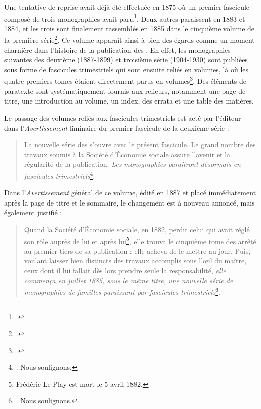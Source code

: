 Une tentative de reprise avait déjà été effectuée en 1875 où \og un premier fascicule composé de trois monographies \fg{} avait paru\footcite[p. III]{averts1t5}. Deux autres paraissent en 1883 et 1884, et les trois sont finalement rassemblés en 1885 dans le cinquième volume de la première série\footcite[p. III]{averts1t5}. Ce volume apparaît ainsi à bien des égards comme un moment charnière dans l'histoire de la publication des \odm. En effet, les monographies suivantes des deuxième (1887-1899) et troisième série (1904-1930) sont publiées sous forme de fascicules trimestriels qui sont ensuite reliés en volumes, là où les quatre premiers tomes étaient directement parus en volumes\footnote{\cite[p. 124]{lorry}.}. Des éléments de paratexte sont systématiquement fournis aux relieurs, notamment une page de titre, une introduction au volume, un index, des errata et une table des matières.

Le passage des volumes reliés aux fascicules trimestriels est acté par l'éditeur dans l'\textit{Avertissement} liminaire du premier fascicule de la deuxième série :

\begin{quote}
    \og La nouvelle série des \odm{} s'ouvre avec 
le présent fascicule. Le grand nombre des travaux soumis à la 
Société d'Économie sociale assure l'avenir et la régularité 
de la publication. \textit{Les monographies paraîtront désormais en 
fascicules trimestriels}\footnote{\cite[\og Avertissement \fg{}]{mono047a}. Nous soulignons.}. \fg{}
\end{quote}

Dans l'\textit{Avertissement} général de ce volume, édité en 1887 et placé immédiatement après la page de titre et le sommaire, le changement est à nouveau annoncé, mais également justifié :

\begin{quote}
    \og Quand la Société d'Économie sociale, en 1882, perdit celui qui 
avait réglé son rôle auprès de lui et après lui\footnote{Frédéric Le Play est mort le 5 avril 1882.}, elle trouva le cinquième tome des \odm{} arrêté au premier tiers de sa publication : elle acheva de le mettre au jour. Puis, voulant laisser bien distincts des travaux accomplis sous l'\oe{}il du maître, ceux dont il lui fallait dès lors prendre seule la responsabilité, \textit{elle commença en juillet 1885, sous le même titre, une nouvelle série de monographies de familles paraissant par fascicules trimestriels}\footnote{\cite[spec. p. II]{s2avert}. Nous soulignons.}. \fg{}
\end{quote}

